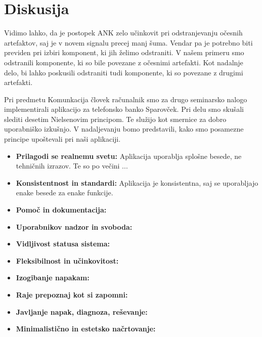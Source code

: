 \documentclass{article}
\begin{document}
\section{Diskusija}
\label{sec:discussion}

Vidimo lahko, da je postopek ANK zelo učinkovit pri odstranjevanju očesnih artefaktov, saj je v novem signalu precej manj šuma. Vendar pa je potrebno biti previden pri izbiri komponent, ki jih želimo odstraniti. V našem primeru smo odstranili komponente, ki so bile povezane z očesnimi artefakti. Kot nadalnje delo, bi lahko poskusili odstraniti tudi komponente, ki so povezane z drugimi artefakti.



Pri predmetu Komunkacija človek računalnik smo za drugo seminarsko nalogo implementirali aplikacijo za telefonsko banko Sparovček. Pri delu smo skušali slediti desetim Nielsenovim principom. Te služijo kot smernice za dobro uporabniško izkušnjo. V nadaljevanju bomo predstavili, kako smo posamezne principe upoštevali pri naši aplikaciji.
\begin {itemize}
    \item \textbf{Prilagodi se realnemu svetu:} Aplikacija uporablja splošne besede, ne tehničnih izrazov. Te so po večini ...
    

    \item \textbf{Konsistentnost in standardi:} Aplikacija je konsistentna, saj se uporabljajo enake besede za enake funkcije.
    

    \item \textbf{Pomoč in dokumentacija:}
    \item \textbf{Uporabnikov nadzor in svoboda:}
    \item \textbf{Vidljivost statusa sistema:}
    \item \textbf{Fleksibilnost in učinkovitost:}
    \item \textbf{Izogibanje napakam:}
    \item \textbf{Raje prepoznaj kot si zapomni:}
    \item \textbf{Javljanje napak, diagnoza, reševanje:}
    \item \textbf{Minimalistično in estetsko načrtovanje:}
\end{itemize}
\end{document}
